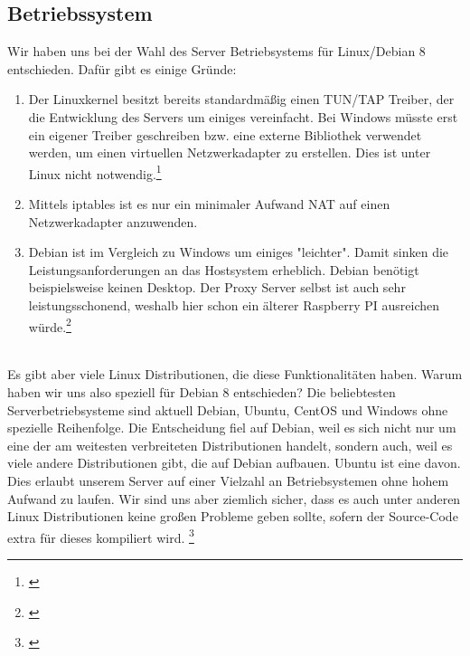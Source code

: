 \subsection{Betriebssystem}
Wir haben uns bei der Wahl des Server Betriebsystems für Linux/Debian 8 entschieden. Dafür gibt es einige Gründe:
\\
\begin{enumerate}
    \item Der Linuxkernel besitzt bereits standardmäßig einen TUN/TAP Treiber, der die Entwicklung des Servers um einiges vereinfacht. Bei Windows müsste erst ein eigener Treiber geschreiben bzw. eine externe Bibliothek verwendet werden, um einen virtuellen Netzwerkadapter zu erstellen. Dies ist unter Linux nicht notwendig.\footnote[1]{\cite[Vgl.][]{SRV2}}
    \item Mittels iptables ist es nur ein minimaler Aufwand NAT auf einen Netzwerkadapter anzuwenden. 
    \item Debian ist im Vergleich zu Windows um einiges "leichter". Damit sinken die Leistungsanforderungen an das Hostsystem erheblich. Debian benötigt beispielsweise keinen Desktop. Der Proxy Server selbst ist auch sehr leistungsschonend, weshalb hier schon ein älterer Raspberry PI ausreichen würde.\footnote[2]{\cite[Vgl.][]{SRV3}}
\end{enumerate}
\ \\
Es gibt aber viele Linux Distributionen, die diese Funktionalitäten haben. Warum haben wir uns also speziell für Debian 8 entschieden? Die beliebtesten Serverbetriebsysteme sind aktuell Debian, Ubuntu, CentOS und Windows ohne spezielle Reihenfolge. Die Entscheidung fiel auf Debian, weil es sich nicht nur um eine der am weitesten verbreiteten Distributionen handelt, sondern auch, weil es viele andere Distributionen gibt, die auf Debian aufbauen. Ubuntu ist eine davon. Dies erlaubt unserem Server auf einer Vielzahl an Betriebsystemen ohne hohem Aufwand zu laufen. Wir sind uns aber ziemlich sicher, dass es auch unter anderen Linux Distributionen keine großen Probleme geben sollte, sofern der Source-Code extra für dieses kompiliert wird. \footnote[3]{\cite[Vgl.][]{SRV1}}

